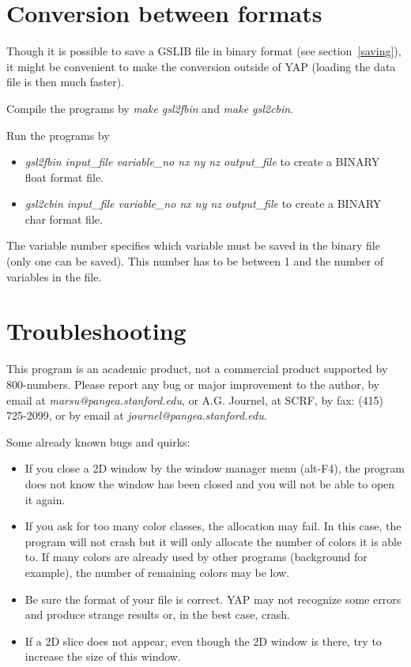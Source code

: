 \section{Conversion between formats}
\label{gsl2bin}

Though it is possible to save a GSLIB file in binary format (see
section~\ref{saving}), it might be
convenient to make the conversion outside of YAP (loading the data
file is then much faster).

Compile the programs by {\em make gsl2fbin} and {\em make gsl2cbin}.

Run the programs by
\begin{itemize}
 \item {\em gsl2fbin input\_file variable\_no nx ny nz output\_file} to create a
       BINARY float format file.
 \item {\em gsl2cbin input\_file variable\_no nx ny nz output\_file} to create a
       BINARY char format file.
\end{itemize}

The variable number specifies which variable must be saved in the binary file
(only one can be saved). This number has to be between 1 and the number
of variables in the file.

\section{Troubleshooting}

This program is an academic product, not a commercial product supported
by 800-numbers.
Please report any bug or major improvement to the author,
by email at {\em marsu@pangea.stanford.edu}, or A.G. Journel, at SCRF, by
fax: (415) 725-2099, or by email at {\em journel@pangea.stanford.edu}.

Some already known bugs and quirks:

\begin{itemize}
 \item If you close a 2D window by the window manager menu (alt-F4),
the program does not know the window has been closed and you will not be able
to open it again.
 \item If you ask for too many color classes, the allocation may fail.
In this case, the program will not crash but it will only allocate the number
of colors it is able to. If many colors are already used by other programs
(background for example), the number of remaining colors may be low.
 \item Be sure the format of your file is correct. YAP may not
recognize some errors and produce strange results or, in the best case, crash.
 \item If a 2D slice does not appear, even though the 2D window is there,
try to increase the size of this window.
\end{itemize}

